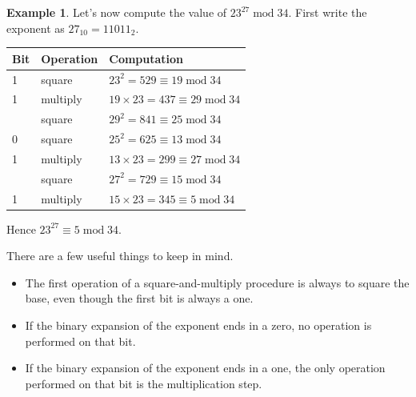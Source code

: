 \documentclass{book}
\theoremstyle{plain}
\theoremstyle{definition}
\newtheorem{example}[theorem]{Example}
\renewcommand{\mod}{\operatorname{mod}}
\renewcommand{\mod}{\operatorname{mod}}
\begin{document}
\begin{example}
Let's now compute the value of $23^{27} \mod 34$. First write the exponent as $27_{10} = 11011_2$.

\begin{center}
\begin{tabular}{lll}
Bit & Operation & Computation \\
\hline
1 & square & $23^2 = 529 \equiv 19 \mod 34$ \\
1 & multiply & $19 \times 23 = 437 \equiv 29 \mod 34$ \\
  & square & $29^2 = 841 \equiv 25 \mod 34$ \\
0 & square & $25^2 = 625 \equiv 13 \mod 34$ \\
1 & multiply & $13 \times 23 = 299 \equiv 27 \mod 34$ \\
  & square & $27^2 = 729 \equiv 15 \mod 34$ \\
1 & multiply & $15 \times 23 = 345 \equiv 5 \mod 34$
\end{tabular}
\end{center}
Hence $23^{27} \equiv 5 \mod 34$.
\end{example}

There are a few useful things to keep in mind.
\begin{itemize}
\item The first operation of a square-and-multiply procedure is always to square the base, even though the first bit is always a one.
\item If the binary expansion of the exponent ends in a zero, no operation is performed on that bit.
\item If the binary expansion of the exponent ends in a one, the only operation performed on that bit is the multiplication step.
\end{itemize}
\end{document}

